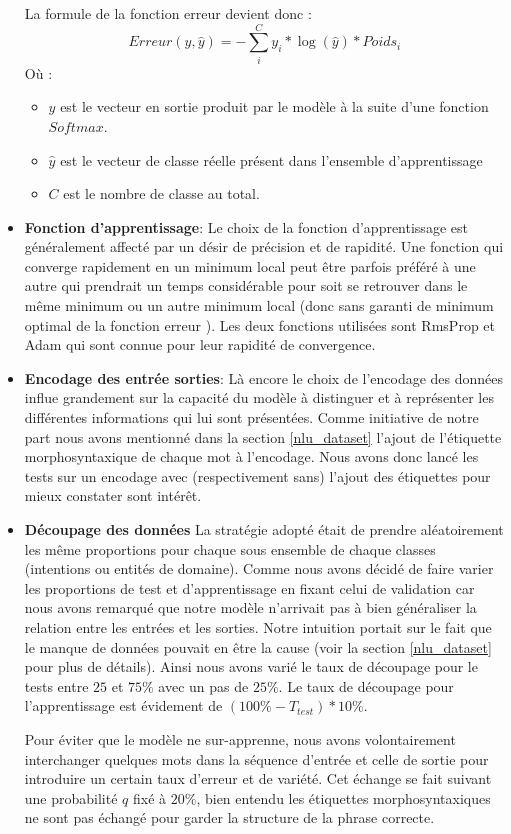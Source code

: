 \begin{itemize}
		La formule de la fonction erreur devient donc : 
		\begin{equation*}
			Erreur(y,\hat{y}) = - \sum_{i}^{C} y_i * \log(\hat{y}) * Poids_i 
		\end{equation*}
		Où : 
		\begin{itemize}
			\item $y$ est le vecteur en sortie produit par le modèle à la suite d'une fonction $Softmax$.
			\item $\hat{y}$ est le vecteur de classe réelle présent dans l'ensemble d'apprentissage
			\item $C$ est le nombre de classe au total.
		\end{itemize}
	
		\item \textbf{Fonction d'apprentissage}:
		Le choix de la fonction d'apprentissage est généralement affecté par un désir de précision et de rapidité. Une fonction qui converge rapidement en un minimum local peut être parfois préféré à une autre qui prendrait un temps considérable pour soit se retrouver dans le même minimum ou un autre minimum local (donc sans garanti de minimum optimal de la fonction erreur ). Les deux fonctions utilisées sont RmsProp et Adam qui sont connue pour leur rapidité de convergence.
		
		\item \textbf{Encodage des entrée sorties}:
		Là encore le choix de l'encodage des données influe grandement sur la capacité du modèle à distinguer et à représenter les différentes informations qui lui sont présentées. Comme initiative de notre part nous avons mentionné dans la section \ref{nlu_dataset} l'ajout de l'étiquette morphosyntaxique de chaque mot à l'encodage. Nous avons donc lancé les tests sur un encodage avec (respectivement sans) l'ajout des étiquettes pour mieux constater sont intérêt.
		
		\item \textbf{Découpage des données}
		La stratégie adopté était de prendre aléatoirement les même proportions pour chaque sous ensemble de chaque classes (intentions ou entités de domaine). Comme nous avons décidé de faire varier les proportions de test et d'apprentissage en fixant celui de validation car nous avons remarqué que notre modèle n'arrivait pas à bien généraliser la relation entre les entrées et les sorties. Notre intuition portait sur le fait que le manque de données pouvait en être la cause (voir la section \ref{nlu_dataset} pour plus de détails). Ainsi nous avons varié le taux de découpage pour le tests entre $25$ et $75\%$ avec un pas de $25\%$. Le taux de découpage pour l'apprentissage est évidement de $(100\%-T_{test})*10\%$.
		\par
		Pour éviter que le modèle ne sur-apprenne, nous avons volontairement interchanger quelques mots dans la séquence d'entrée et celle de sortie pour introduire un certain taux d'erreur et de variété. Cet échange se fait suivant une probabilité $q$ fixé à $20\%$, bien entendu les étiquettes morphosyntaxiques ne sont pas échangé pour garder la structure de la phrase correcte.
	\end{itemize}
